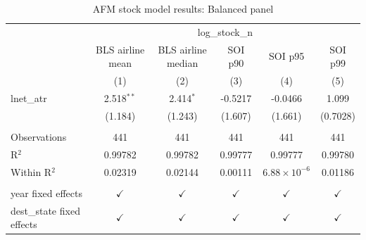
\begin{table}[htbp]
   \caption{AFM stock model results: Balanced panel}
   \bigskip
   \centering
   \small
   \begin{tabular}{lccccc}
      \toprule
       & \multicolumn{5}{c}{log\_stock\_n}\\
                                 & BLS airline mean & BLS airline median & SOI p90       & SOI p95               & SOI p99 \\   
                                 & (1)              & (2)                & (3)           & (4)                   & (5)\\  
      \midrule 
      lnet\_atr                  & 2.518$^{**}$     & 2.414$^{*}$        & -0.5217       & -0.0466               & 1.099\\   
                                 & (1.184)          & (1.243)            & (1.607)       & (1.661)               & (0.7028)\\   
       \\
      Observations               & 441              & 441                & 441           & 441                   & 441\\  
      R$^2$                      & 0.99782          & 0.99782            & 0.99777       & 0.99777               & 0.99780\\  
      Within R$^2$               & 0.02319          & 0.02144            & 0.00111       & $6.88\times 10^{-6}$  & 0.01186\\  
       \\
      year fixed effects         & $\checkmark$     & $\checkmark$       & $\checkmark$  & $\checkmark$          & $\checkmark$\\   
      dest\_state fixed effects  & $\checkmark$     & $\checkmark$       & $\checkmark$  & $\checkmark$          & $\checkmark$\\   
      \bottomrule
   \end{tabular}
\end{table}


